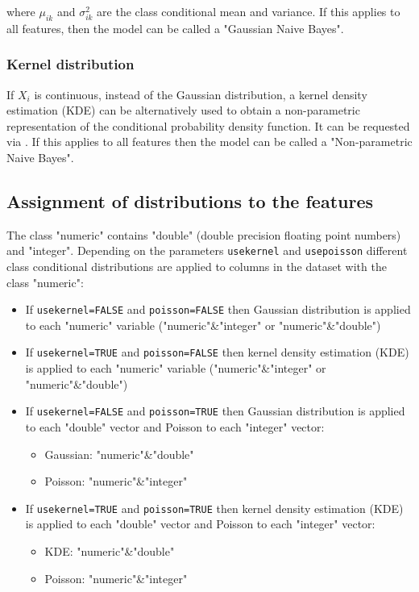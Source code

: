 \documentclass{article}\usepackage[]{graphicx}\usepackage[]{color}
\begin{document}
where $\mu_{ik}$ and $\sigma^2_{ik}$ are the class conditional mean and variance. If this applies to all features, then the model can be called a "Gaussian Naive Bayes".

\subsubsection{Kernel distribution}

If $X_i$ is continuous, instead of the Gaussian distribution, a kernel density estimation (KDE) can be alternatively used to obtain a non-parametric representation of the conditional probability density function. It can be requested via \textcolor{darkgreen}{{}}. If this applies to all features then the model can be called a "Non-parametric Naive Bayes".


\subsection{Assignment of distributions to the features}

The class "numeric" contains "double" (double precision floating point numbers) and "integer". Depending on the parameters \texttt{usekernel} and \texttt{usepoisson} different class conditional distributions are applied to columns in the dataset with the class "numeric":

\begin{itemize}
    \item If \texttt{usekernel=FALSE} and \texttt{poisson=FALSE} then Gaussian distribution is applied to each "numeric" variable ("numeric"\&"integer" or "numeric"\&"double")

    \item If \texttt{usekernel=TRUE} and \texttt{poisson=FALSE} then kernel density estimation (KDE) is applied to each "numeric" variable ("numeric"\&"integer" or "numeric"\&"double")

    \item If \texttt{usekernel=FALSE} and \texttt{poisson=TRUE} then Gaussian distribution is applied to each "double" vector and Poisson to each "integer" vector:
    \begin{itemize}
        \item Gaussian: "numeric"\&"double"
        \item Poisson: "numeric"\&"integer"
    \end{itemize}

    \item If \texttt{usekernel=TRUE} and \texttt{poisson=TRUE} then kernel density estimation (KDE) is applied to each "double" vector and Poisson to each "integer" vector:

    \begin{itemize}
        \item KDE: "numeric"\&"double"
        \item Poisson: "numeric"\&"integer"
    \end{itemize}

\end{itemize}
\end{document}
